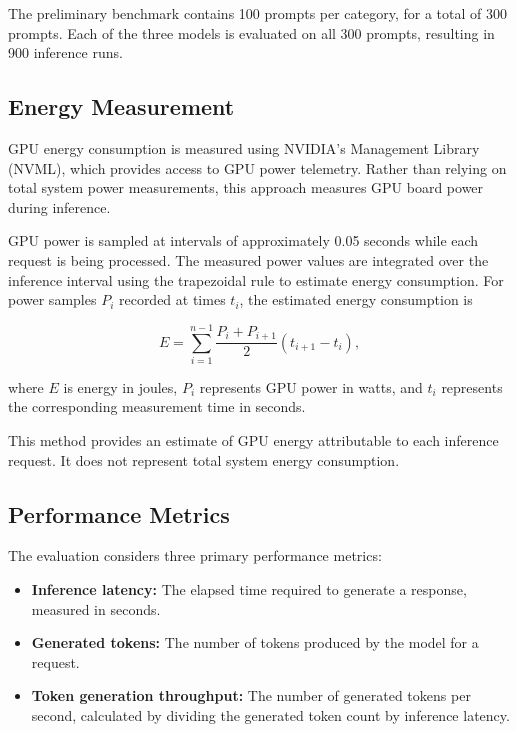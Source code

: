 \documentclass[conference]{IEEEtran}
\begin{document}
The preliminary benchmark contains 100 prompts per category, for a
total of 300 prompts. Each of the three models is evaluated on all
300 prompts, resulting in 900 inference runs.

\subsection{Energy Measurement}

GPU energy consumption is measured using NVIDIA's Management Library
(NVML), which provides access to GPU power telemetry. Rather than
relying on total system power measurements, this approach measures
GPU board power during inference.

GPU power is sampled at intervals of approximately 0.05 seconds while
each request is being processed. The measured power values are
integrated over the inference interval using the trapezoidal rule to
estimate energy consumption. For power samples $P_i$ recorded at times
$t_i$, the estimated energy consumption is

\begin{equation}
E = \sum_{i=1}^{n-1}
\frac{P_i + P_{i+1}}{2}(t_{i+1}-t_i),
\label{eq:energy}
\end{equation}

where $E$ is energy in joules, $P_i$ represents GPU power in watts,
and $t_i$ represents the corresponding measurement time in seconds.

This method provides an estimate of GPU energy attributable to each
inference request. It does not represent total system energy
consumption.

\subsection{Performance Metrics}

The evaluation considers three primary performance metrics:

\begin{itemize}
    \item \textbf{Inference latency:} The elapsed time required to
    generate a response, measured in seconds.
    \item \textbf{Generated tokens:} The number of tokens produced by
    the model for a request.
    \item \textbf{Token generation throughput:} The number of generated
    tokens per second, calculated by dividing the generated token
    count by inference latency.
\end{itemize}
\end{document}
